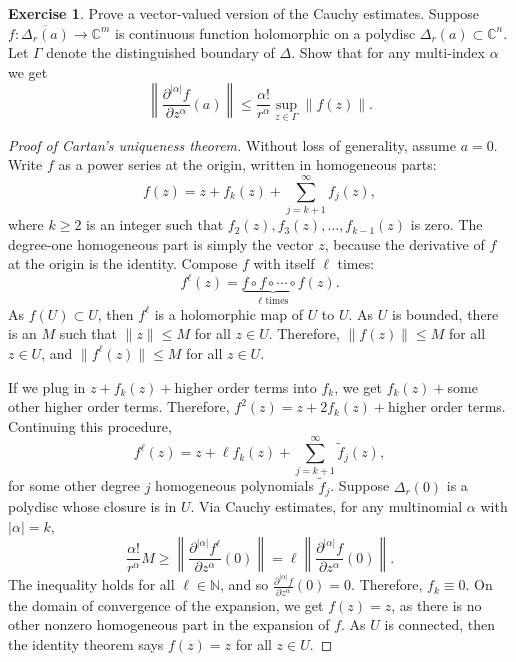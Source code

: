 \documentclass[12pt,openany]{book}
\newcommand{\sabs}[1]{\lvert {#1} \rvert}
\newcommand{\snorm}[1]{\lVert {#1} \rVert}
\newcommand{\abs}[1]{\left\lvert {#1} \right\rvert}
\newcommand{\norm}[1]{\left\lVert {#1} \right\rVert}
\newcommand{\C}{{\mathbb{C}}}
\newcommand{\N}{{\mathbb{N}}}
\theoremstyle{plain}
\theoremstyle{remark}
\theoremstyle{definition}
\newenvironment{exbox}{%
    \def\FrameCommand{\vrule width 1pt \relax\hspace{10pt}}%
    \MakeFramed{\advance\hsize-\width\FrameRestore}%
}{%
    \endMakeFramed
}
\theoremstyle{exercise}
\newtheorem{exercise}{Exercise}[section]
\theoremstyle{example}
\begin{document}
\begin{exbox}
\begin{exercise}
Prove a vector-valued version of the Cauchy estimates.  Suppose $f
\colon \overline{\Delta_r(a)} \to \C^m$ is continuous function holomorphic
on a polydisc $\Delta_r(a) \subset \C^n$.  Let $\Gamma$ denote the distinguished
boundary of $\Delta$.  Show that for any multi-index $\alpha$ we get
\begin{equation*}
\norm{\frac{\partial^{\abs{\alpha}}f}{\partial z^\alpha} (a)}
\leq
\frac{\alpha!}{r^\alpha} \sup_{z\in \Gamma} \norm{f(z)} .
\end{equation*}
\end{exercise}
\end{exbox}



\begin{proof}[Proof of Cartan's uniqueness theorem]
Without loss of generality, assume $a=0$.  Write $f$ 
as a power series at the origin, written in homogeneous parts:
\begin{equation*}
f(z) = z + f_k(z) + \sum_{j=k+1}^\infty f_j(z) ,
\end{equation*}
where $k \geq 2$ is an integer such that $f_2(z),f_3(z),\ldots,f_{k-1}(z)$ is zero.
The degree-one homogeneous part is simply the vector $z$,
because
the derivative of $f$ at the origin is the identity.
Compose $f$ with itself $\ell$ times:
\begin{equation*}
f^\ell(z) = \underbrace{f \circ f \circ \cdots \circ f}_{\ell\text{ times}}
(z) .
\end{equation*}
As $f(U) \subset U$, then $f^\ell$ is a holomorphic map
of $U$ to $U$.  As $U$ is bounded, there is an $M$ such that $\snorm{z} \leq
M$ for all $z \in U$.  Therefore, $\snorm{f(z)} \leq M$ for all $z \in U$, and
$\snorm{f^\ell(z)} \leq M$ for all $z \in U$.

If we plug in $z + f_k(z) + {}$higher order terms
into $f_k$, we get $f_k(z) + {}$some other higher order terms.
Therefore, $f^2(z) = z + 2 f_k(z) + {}$higher order terms.
Continuing this procedure,
\begin{equation*}
f^\ell(z) = z + \ell f_k(z) + \sum_{j=k+1}^\infty \tilde{f}_j(z) ,
\end{equation*}
for some other degree $j$ homogeneous polynomials $\tilde{f}_j$.  Suppose $\Delta_r(0)$ is a polydisc whose
closure is in $U$.
Via Cauchy estimates,
for any multinomial $\alpha$ with $\sabs{\alpha}=k$,
\begin{equation*}
\frac{\alpha!}{r^\alpha} M
\geq
\norm{\frac{\partial^{\sabs{\alpha}} f^\ell}{\partial z^\alpha}(0)}
=
\ell
\norm{\frac{\partial^{\sabs{\alpha}} f}{\partial z^\alpha}(0)} .
\end{equation*}
The inequality holds for all $\ell \in \N$, and so
$\frac{\partial^{\sabs{\alpha}} f}{\partial z^\alpha}(0) = 0$.  Therefore,
$f_k \equiv 0$.  On the domain of convergence of the expansion,
we get $f(z) = z$, as there is no other
nonzero homogeneous part in the expansion of $f$.  As $U$ is connected,
then the identity theorem says $f(z) = z$ for all $z \in U$.
\end{proof}
\end{document}
